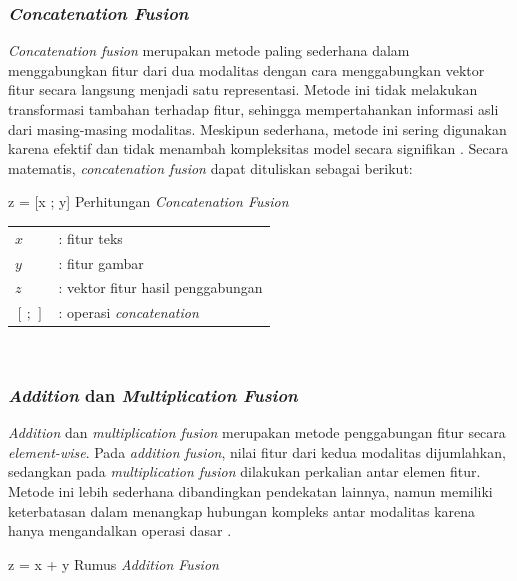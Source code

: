 \subsubsection{\textit{Concatenation Fusion}}
\textit{Concatenation fusion} merupakan metode paling sederhana dalam menggabungkan fitur dari dua modalitas dengan cara menggabungkan vektor fitur secara langsung menjadi satu representasi. Metode ini tidak melakukan transformasi tambahan terhadap fitur, sehingga mempertahankan informasi asli dari masing-masing modalitas. Meskipun sederhana, metode ini sering digunakan karena efektif dan tidak menambah kompleksitas model secara signifikan \cite{ngiam2011multimodal}. Secara matematis, \textit{concatenation fusion} dapat dituliskan sebagai berikut:

\begin{equationcaptioned}{
	z = [x ; y]
}{
	Perhitungan \textit{Concatenation Fusion}
}
\end{equationcaptioned}

\noindent
{}

\begin{tabular}{l l}
$x$      & : fitur teks \\
$y$      & : fitur gambar \\
$z$      & : vektor fitur hasil penggabungan \\
$[\,;\,]$ & : operasi \textit{concatenation} \\
\end{tabular} \\

\subsubsection{\textit{Addition} dan \textit{Multiplication Fusion}} 
\textit{Addition} dan \textit{multiplication fusion} merupakan metode penggabungan fitur secara \textit{element-wise}. Pada \textit{addition fusion}, nilai fitur dari kedua modalitas dijumlahkan, sedangkan pada \textit{multiplication fusion} dilakukan perkalian antar elemen fitur. Metode ini lebih sederhana dibandingkan pendekatan lainnya, namun memiliki keterbatasan dalam menangkap hubungan kompleks antar modalitas karena hanya mengandalkan operasi dasar \cite{kiela2019supervised}.

\begin{equationcaptioned}{
	z = x + y
}{
	Rumus \textit{Addition Fusion}
}
\end{equationcaptioned}

